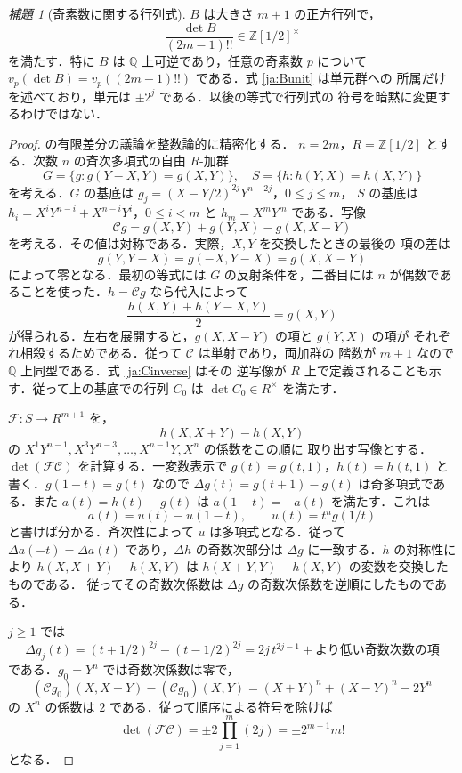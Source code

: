 \documentclass[12pt]{amsart}
\theoremstyle{definition}
\theoremstyle{remark}
\numberwithin{equation}{section}
\newcommand{\Z}{\mathbb{Z}}
\newcommand{\Q}{\mathbb{Q}}
\newcommand{\Rdy}{\Z[1/2]}
\newtheorem{jlem}[thm]{補題}
\theoremstyle{definition}
\theoremstyle{remark}
\begin{document}
\begin{jlem}[奇素数に関する行列式]\label{ja:Blemma}
$B$ は大きさ $m+1$ の正方行列で，
\begin{equation}\label{ja:Bunit}
 \frac{\det B}{(2m-1)!!}\in\Rdy^\times
\end{equation}
を満たす．特に $B$ は $\Q$ 上可逆であり，任意の奇素数 $p$ について
$v_p(\det B)=v_p((2m-1)!!)$ である．式 \eqref{ja:Bunit} は単元群への
所属だけを述べており，単元は $\pm2^j$ である．以後の等式で行列式の
符号を暗黙に変更するわけではない．
\end{jlem}

\begin{proof}
\cite[\S4, Proposition 3]{jGKZ} の有限差分の議論を整数論的に精密化する．
$n=2m$，$R=\Rdy$ とする．次数 $n$ の斉次多項式の自由 $R$-加群
\[
 G=\{g:g(Y-X,Y)=g(X,Y)\},\quad
 S=\{h:h(Y,X)=h(X,Y)\}
\]
を考える．$G$ の基底は
$g_j=(X-Y/2)^{2j}Y^{n-2j}$，$0\leq j\leq m$，
$S$ の基底は $h_i=X^iY^{n-i}+X^{n-i}Y^i$，$0\leq i<m$ と
$h_m=X^mY^m$ である．写像
\[
 \mathcal Cg=g(X,Y)+g(Y,X)-g(X,X-Y)
\]
を考える．その値は対称である．実際，$X,Y$ を交換したときの最後の
項の差は
\[
 g(Y,Y-X)=g(-X,Y-X)=g(X,X-Y)
\]
によって零となる．最初の等式には $G$ の反射条件を，二番目には
$n$ が偶数であることを使った．$h=\mathcal Cg$ なら代入によって
\begin{equation}\label{ja:Cinverse}
 \frac{h(X,Y)+h(Y-X,Y)}2=g(X,Y)
\end{equation}
が得られる．左右を展開すると，$g(X,X-Y)$ の項と $g(Y,X)$ の項が
それぞれ相殺するためである．従って $\mathcal C$ は単射であり，両加群の
階数が $m+1$ なので $\Q$ 上同型である．式 \eqref{ja:Cinverse} はその
逆写像が $R$ 上で定義されることも示す．従って上の基底での行列 $C_0$ は
$\det C_0\in R^\times$ を満たす．

$\mathcal F:S\to R^{m+1}$ を，
\[
 h(X,X+Y)-h(X,Y)
\]
の $X^1Y^{n-1},X^3Y^{n-3},\ldots,X^{n-1}Y,X^n$ の係数をこの順に
取り出す写像とする．$\det(\mathcal F\mathcal C)$ を計算する．一変数表示で
$g(t)=g(t,1)$，$h(t)=h(t,1)$ と書く．$g(1-t)=g(t)$ なので
$\Delta g(t)=g(t+1)-g(t)$ は奇多項式である．また
$a(t)=h(t)-g(t)$ は $a(1-t)=-a(t)$ を満たす．これは
\[
 a(t)=u(t)-u(1-t),\qquad u(t)=t^n g(1/t)
\]
と書けば分かる．斉次性によって $u$ は多項式となる．従って
$\Delta a(-t)=\Delta a(t)$ であり，$\Delta h$ の奇数次部分は
$\Delta g$ に一致する．$h$ の対称性により
$h(X,X+Y)-h(X,Y)$ は $h(X+Y,Y)-h(X,Y)$ の変数を交換したものである．
従ってその奇数次係数は $\Delta g$ の奇数次係数を逆順にしたものである．

$j\geq1$ では
\[
 \Delta g_j(t)=(t+1/2)^{2j}-(t-1/2)^{2j}
             =2j\,t^{2j-1}+\text{より低い奇数次数の項}
\]
である．$g_0=Y^n$ では奇数次係数は零で，
\[
 (\mathcal Cg_0)(X,X+Y)-(\mathcal Cg_0)(X,Y)
 =(X+Y)^n+(X-Y)^n-2Y^n
\]
の $X^n$ の係数は $2$ である．従って順序による符号を除けば
\[
 \det(\mathcal F\mathcal C)=\pm2\prod_{j=1}^m(2j)
                          =\pm2^{m+1}m!
\]
となる．


\end{proof}
\end{document}
